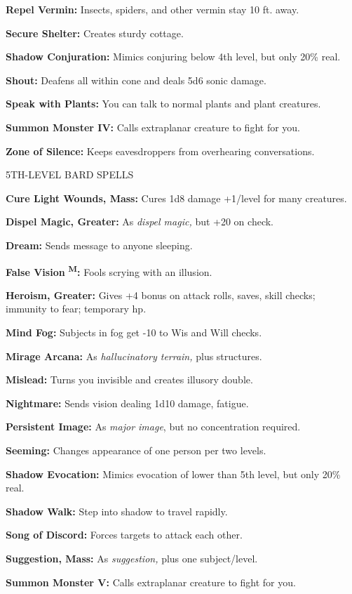 \documentclass{article}
\begin{document}
\textbf{Repel Vermin:} Insects, spiders, and other vermin stay 10 ft. away.

\textbf{Secure Shelter:} Creates sturdy cottage.

\textbf{Shadow Conjuration:} Mimics conjuring below 4th level, but only 20\% real.

\textbf{Shout:} Deafens all within cone and deals 5d6 sonic damage.

\textbf{Speak with Plants:} You can talk to normal plants and plant creatures.

\textbf{Summon Monster IV:} Calls extraplanar creature to fight for you.

\textbf{Zone of Silence:} Keeps eavesdroppers from overhearing conversations.

5TH-LEVEL BARD SPELLS

\textbf{Cure Light Wounds, Mass:} Cures 1d8 damage +1/level for many creatures.

\textbf{Dispel Magic, Greater:} As \textit{dispel magic, }but +20 on check.

\textbf{Dream:} Sends message to anyone sleeping.

\textbf{False Vision }\textsuperscript{\textbf{M}}\textbf{:} Fools scrying with 
an illusion.

\textbf{Heroism, Greater:} Gives +4 bonus on attack rolls, saves, skill checks; 
immunity to fear; temporary hp.

\textbf{Mind Fog:} Subjects in fog get -10 to Wis and Will checks.

\textbf{Mirage Arcana:} As \textit{hallucinatory terrain, }plus structures.

\textbf{Mislead:} Turns you invisible and creates illusory double.

\textbf{Nightmare:} Sends vision dealing 1d10 damage, fatigue.

\textbf{Persistent Image:} As \textit{major image}, but no concentration required.

\textbf{Seeming:} Changes appearance of one person per two levels.

\textbf{Shadow Evocation:} Mimics evocation of lower than 5th level, but only 20\% 
real.

\textbf{Shadow Walk:} Step into shadow to travel rapidly.

\textbf{Song of Discord:} Forces targets to attack each other.

\textbf{Suggestion, Mass:} As \textit{suggestion, }plus one subject/level.

\textbf{Summon Monster V:} Calls extraplanar creature to fight for you.
\end{document}
